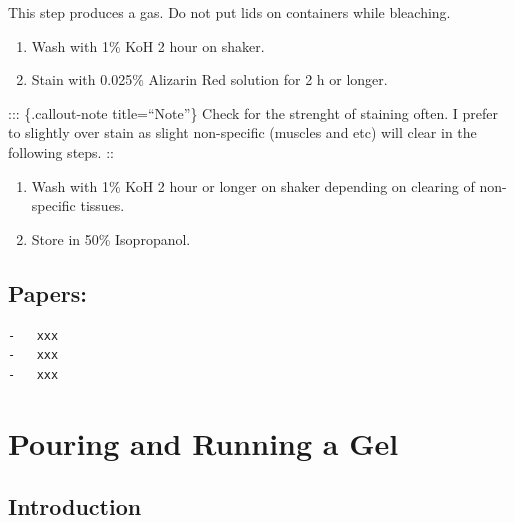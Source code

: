 \documentclass[
  letterpaper,
  DIV=11,
  numbers=noendperiod]{scrreprt}
\begin{document}
\begin{tcolorbox}[enhanced jigsaw, rightrule=.15mm, title=\textcolor{quarto-callout-note-color}{\faInfo}\hspace{0.5em}{Warning}, titlerule=0mm, opacitybacktitle=0.6, toprule=.15mm, bottomrule=.15mm, opacityback=0, left=2mm, colframe=quarto-callout-note-color-frame, breakable, coltitle=black, colback=white, colbacktitle=quarto-callout-note-color!10!white, bottomtitle=1mm, leftrule=.75mm, toptitle=1mm, arc=.35mm]

This step produces a gas. Do not put lids on containers while bleaching.

\end{tcolorbox}

\begin{enumerate}
\def\labelenumi{\arabic{enumi}.}
\setcounter{enumi}{3}
\item
  Wash with 1\% KoH 2 hour on shaker.
\item
  Stain with 0.025\% Alizarin Red solution for 2 h or longer.
\end{enumerate}

::: \{.callout-note title=``Note''\} Check for the strenght of staining
often. I prefer to slightly over stain as slight non-specific (muscles
and etc) will clear in the following steps. ::

\begin{enumerate}
\def\labelenumi{\arabic{enumi}.}
\setcounter{enumi}{5}
\item
  Wash with 1\% KoH 2 hour or longer on shaker depending on clearing of
  non-specific tissues.
\item
  Store in 50\% Isopropanol.
\end{enumerate}

\hypertarget{papers}{%
\section{Papers:}\label{papers}}

\begin{verbatim}
-   xxx
-   xxx
-   xxx
\end{verbatim}

\hypertarget{sec-molecular-gel}{%
\chapter{Pouring and Running a Gel}\label{sec-molecular-gel}}

\hypertarget{introduction-16}{%
\section{Introduction}\label{introduction-16}}
\end{document}
